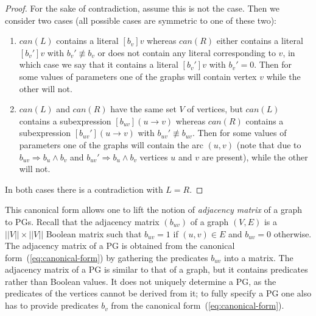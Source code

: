 \begin{proof}
For the sake of contradiction, assume this is not the case. Then we
consider two cases (all possible cases are symmetric to one of these
two):
\begin{enumerate}
\item $\mathit{can}(L)$ contains a literal $[b_{v}]v$ whereas $\mathit{can}(R)$
either contains a literal $[b_{v}']v$ with $b_{v}'\not\equiv b_{v}$
or does not contain any literal corresponding to $v$, in which case
we say that it contains a literal $[b_{v}']v$ with $b_{v}'=0$. Then
for some values of parameters one of the graphs will contain vertex
$v$ while the other will not.
\item $\mathit{can}(L)$ and $\mathit{can}(R)$ have the same set $V$ of
vertices, but $\mathit{can}(L)$ contains a subexpression \foreignlanguage{english}{$[b_{uv}](u\rightarrow v)$}
whereas $\mathit{can}(R)$ contains a subexpression \foreignlanguage{english}{$[b_{uv}'](u\rightarrow v)$}
with $b_{uv}'\not\equiv b_{uv}$. Then for some values of parameters
one of the graphs will contain the arc $(u,v)$ (note that due to
$b_{uv}\Rightarrow b_{u}\wedge b_{v}$ and $b_{uv}'\Rightarrow b_{u}\wedge b_{v}$
vertices $u$ and $v$ are present), while the other will not.
\end{enumerate}
In both cases there is a contradiction with $L=R$.
\end{proof}
This canonical form allows one to lift the notion of \emph{adjacency
matrix} of a graph to PGs. Recall that the adjacency matrix $(b_{uv})$
of a graph $(V,E)$ is a $||V||\times||V||$ Boolean matrix such that
$b_{uv}=1$ if $(u,v)\in E$ and $b_{uv}=0$ otherwise. The adjacency
matrix of a PG is obtained from the canonical form~(\ref{eq:canonical-form})
by gathering the predicates $b_{uv}$ into a matrix. The adjacency
matrix of a PG is similar to that of a graph, but it contains predicates
rather than Boolean values. It does not uniquely determine a PG, as
the predicates of the vertices cannot be derived from it; to fully
specify a PG one also has to provide predicates $b_{v}$ from the
canonical form~(\ref{eq:canonical-form}). 

